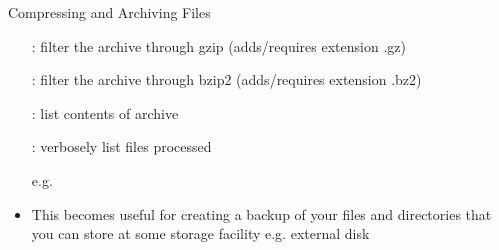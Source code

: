 \documentclass[10pt,t]{beamer}
\begin{document}
\begin{frame}{Compressing and Archiving Files}
\begin{itemize}
    \item[] : filter the archive through gzip (adds/requires extension .gz)
    \item[] : filter the archive through bzip2 (adds/requires extension .bz2)
    \item[] : list contents of archive
    \item[] : verbosely list files processed
    \item[e.g.] 
    \item This becomes useful for creating a backup of your files and directories that you can store at some storage facility e.g. external disk
  \end{itemize}
\end{frame}
\end{document}
